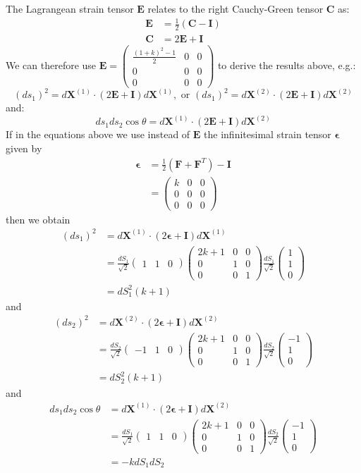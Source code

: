 \documentclass{article}
\newcommand{\ee}{\end{equation}}
\newcommand{\be}{\begin{equation}}
\newcommand{\bs}{\boldsymbol}
\newcommand{\emat}{\end{pmatrix}}
\newcommand{\bmat}{\begin{pmatrix}}
\newcommand{\esmat}{\end{smallmatrix}\right)}
\newcommand{\bsmat}{\left(\begin{smallmatrix}}
\begin{document}
\begin{enumerate}
The Lagrangean strain tensor $\bs{E}$ relates to  the right Cauchy-Green tensor $\bs{C}$ as:
\begin{align}
\bs{E} &= \frac{1}{2}(\bs{C} - \bs{I}) \\
\bs{C} & =2\bs{E} + \bs{I}
\end{align}
We can therefore use $\bs{E} = \bsmat \frac{(1+k)^2-1}{2} & 0 & 0 \\ 0 & 0 & 0 \\ 0 & 0 & 0\esmat$ to
derive the results above, e.g.:
\be
(ds_1)^2=d\bs{X}^{(1)}\cdot (2\bs{E}+\bs{I}) d\bs{X}^{(1)}, \textrm{ or } (ds_1)^2=d\bs{X}^{(2)}\cdot (2\bs{E}+\bs{I})
d\bs{X}^{(2)}
\ee
and:
\be
ds_1ds_2\cos \theta=d\bs{X}^{(1)}\cdot (2\bs{E}+\bs{I}) d\bs{X}^{(2)}
\ee
If in the equations above we use instead of $\bs{E}$ the infinitesimal strain tensor $\bs{\epsilon}$ given by
\begin{align}
\bs{\epsilon} &= \frac{1}{2}(\bs{F}+\bs{F}^T)-\bs{I}\\
&= \bmat k & 0 & 0 \\ 0 & 0 &
0 \\ 0 & 0 & 0\emat
\end{align}
then we obtain
\begin{align}
(ds_1)^2 &= d\bs{X}^{(1)}\cdot (2\bs{\epsilon}+\bs{I}) d\bs{X}^{(1)} \\ \nonumber
&= \frac{dS_1}{\sqrt{2}} \bmat 1  & 1 & 0 \emat \bmat 2k+1 & 0 & 0 \\ 0 & 1 & 0 \\ 0 & 0 & 1 \emat
\frac{dS_1}{\sqrt{2}} \bmat 1 \\1 \\0 \emat \\ \nonumber
&= dS_1^2 (k+1)
\end{align}
and
\begin{align}
(ds_2)^2 &= d\bs{X}^{(2)}\cdot (2\bs{\epsilon}+\bs{I}) d\bs{X}^{(2)} \\ \nonumber
&= \frac{dS_2}{\sqrt{2}} \bmat -1  & 1 & 0 \emat \bmat 2k+1 & 0 & 0 \\ 0 & 1 & 0 \\ 0 & 0 & 1\emat
\frac{dS_2}{\sqrt{2}} \bmat -1 \\1 \\0 \emat \\ \nonumber
&= dS_2^2 (k+1)
\end{align}
and
\begin{align}
ds_1 ds_2 \cos \theta &= d\bs{X}^{(1)}\cdot (2\bs{\epsilon}+\bs{I}) d\bs{X}^{(2)} \\ \nonumber
&= \frac{dS_1}{\sqrt{2}} \bmat 1  & 1 & 0 \emat \bmat  2k+1 & 0 & 0 \\ 0 & 1 & 0 \\ 0 & 0 & 1 \emat
\frac{dS_2}{\sqrt{2}} \bmat -1 \\1 \\0 \emat \\ \nonumber &= -k dS_1 dS_2
\end{align}


\end{enumerate}
\end{document}
